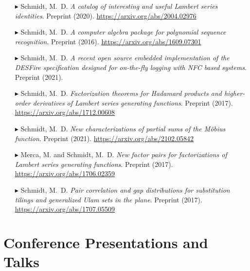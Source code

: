 \documentclass[10pt,letterpaper,sans]{moderncv}        %
\begin{document}
\begin{itemize}
\setlength{\itemsep}{0.75mm} 

\item[$\blacktriangleright$]
Schmidt, M.~D. \emph{A catalog of interesting and useful Lambert series identities}. 
Preprint (2020). 
\url{https://arxiv.org/abs/2004.02976} 

\item[$\blacktriangleright$]
Schmidt, M.~D. \emph{A computer algebra package for polynomial sequence recognition}. 
Preprint (2016). 
\url{https://arxiv.org/abs/1609.07301}

\item[$\blacktriangleright$]
Schmidt, M.~D. \emph{A recent open source embedded implementation of the DESFire specification 
                     designed for on-the-fly logging with NFC based systems}. Preprint (2021).

\item[$\blacktriangleright$]
Schmidt, M.~D. \emph{Factorization theorems for Hadamard products and 
                     higher-order derivatives of Lambert series generating functions}. 
Preprint (2017). 
\url{https://arxiv.org/abs/1712.00608} 

\item[$\blacktriangleright$]
Schmidt, M.~D. \emph{New characterizations of partial sums of the M\"{o}bius function}. 
Preprint (2021). 
\url{https://arxiv.org/abs/2102.05842}

\item[$\blacktriangleright$]
Merca, M. and Schmidt, M.~D. \emph{New factor pairs for factorizations of Lambert series generating functions}. 
Preprint (2017). 
\url{https://arxiv.org/abs/1706.02359}

\item[$\blacktriangleright$]
Schmidt, M.~D. \emph{Pair correlation and gap distributions for substitution tilings and 
                     generalized Ulam sets in the plane}. 
Preprint (2017). 
\url{https://arxiv.org/abs/1707.05509}

\end{itemize}

\section{Conference Presentations and Talks} 
\end{document}
